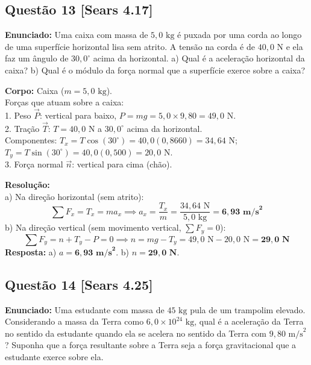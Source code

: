 \documentclass[11pt,a4paper]{article}
\begin{document}
\vspace{0.3cm}
\subsection*{Questão 13 [Sears 4.17]}
\textbf{Enunciado:} Uma caixa com massa de $5,0\text{ kg}$ é puxada por uma corda ao longo de uma superfície horizontal lisa sem atrito. A tensão na corda é de $40,0\text{ N}$ e ela faz um ângulo de $30,0^\circ$ acima da horizontal. a) Qual é a aceleração horizontal da caixa? b) Qual é o módulo da força normal que a superfície exerce sobre a caixa?

\begin{dclbox}
\textbf{Corpo:} Caixa ($m = 5,0\text{ kg}$).\\
Forças que atuam sobre a caixa:\\
1. Peso $\vec{P}$: vertical para baixo, $P = mg = 5,0 \times 9,80 = 49,0\text{ N}$.\\
2. Tração $\vec{T}$: $T = 40,0\text{ N}$ a $30,0^\circ$ acima da horizontal.\\
   Componentes: $T_x = T\cos(30^\circ) = 40,0(0,8660) = 34,64\text{ N}$; $T_y = T\sin(30^\circ) = 40,0(0,500) = 20,0\text{ N}$.\\
3. Força normal $\vec{n}$: vertical para cima (chão).
\end{dclbox}

\noindent
\textbf{Resolução:}\\
a) Na direção horizontal (sem atrito):
\[ \sum F_x = T_x = m a_x \implies a_x = \frac{T_x}{m} = \frac{34,64\text{ N}}{5,0\text{ kg}} = \mathbf{6,93\text{ m/s}^2} \]
b) Na direção vertical (sem movimento vertical, $\sum F_y = 0$):
\[ \sum F_y = n + T_y - P = 0 \implies n = mg - T_y = 49,0\text{ N} - 20,0\text{ N} = \mathbf{29,0\text{ N}} \]
\textbf{Resposta:} a) $a = \mathbf{6,93\text{ m/s}^2}$. b) $n = \mathbf{29,0\text{ N}}$.

\vspace{0.3cm}
\subsection*{Questão 14 [Sears 4.25]}
\textbf{Enunciado:} Uma estudante com massa de $45\text{ kg}$ pula de um trampolim elevado. Considerando a massa da Terra como $6,0 \times 10^{24}\text{ kg}$, qual é a aceleração da Terra no sentido da estudante quando ela se acelera no sentido da Terra com $9,80\text{ m/s}^2$? Suponha que a força resultante sobre a Terra seja a força gravitacional que a estudante exerce sobre ela.
\end{document}
